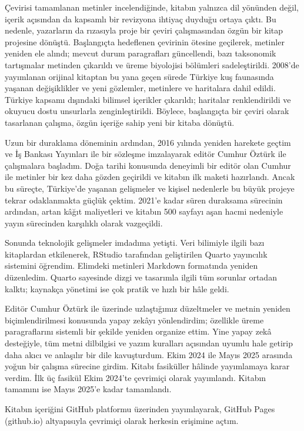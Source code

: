 \documentclass[
  10.5pt,
  a4paper,
  DIV=11,
  numbers=noendperiod,
  twocolumn]{scrreprt}
\begin{document}
Çevirisi tamamlanan metinler incelendiğinde, kitabın yalnızca dil
yönünden değil, içerik açısından da kapsamlı bir revizyona ihtiyaç
duyduğu ortaya çıktı. Bu nedenle, yazarların da rızasıyla proje bir
çeviri çalışmasından özgün bir kitap projesine dönüştü. Başlangıçta
hedeflenen çevirinin ötesine geçilerek, metinler yeniden ele alındı;
mevcut durum paragrafları güncellendi, bazı taksonomik tartışmalar
metinden çıkarıldı ve üreme biyolojisi bölümleri sadeleştirildi. 2008'de
yayımlanan orijinal kitaptan bu yana geçen sürede Türkiye kuş faunasında
yaşanan değişiklikler ve yeni gözlemler, metinlere ve haritalara dahil
edildi. Türkiye kapsamı dışındaki bilimsel içerikler çıkarıldı;
haritalar renklendirildi ve okuyucu dostu unsurlarla zenginleştirildi.
Böylece, başlangıçta bir çeviri olarak tasarlanan çalışma, özgün içeriğe
sahip yeni bir kitaba dönüştü.

Uzun bir duraklama döneminin ardından, 2016 yılında yeniden harekete
geçtim ve İş Bankası Yayınları ile bir sözleşme imzalayarak editör
Cumhur Öztürk ile çalışmalara başladım. Doğa tarihi konusunda deneyimli
bir editör olan Cumhur ile metinler bir kez daha gözden geçirildi ve
kitabın ilk maketi hazırlandı. Ancak bu süreçte, Türkiye'de yaşanan
gelişmeler ve kişisel nedenlerle bu büyük projeye tekrar odaklanmakta
güçlük çektim. 2021'e kadar süren duraksama sürecinin ardından, artan
kâğıt maliyetleri ve kitabın 500 sayfayı aşan hacmi nedeniyle yayın
sürecinden karşılıklı olarak vazgeçildi.

Sonunda teknolojik gelişmeler imdadıma yetişti. Veri bilimiyle ilgili
bazı kitaplardan etkilenerek, RStudio tarafından geliştirilen Quarto
yayıncılık sistemini öğrendim. Elimdeki metinleri Markdown formatında
yeniden düzenledim. Quarto sayesinde dizgi ve tasarımla ilgili tüm
sorunlar ortadan kalktı; kaynakça yönetimi ise çok pratik ve hızlı bir
hâle geldi.

Editör Cumhur Öztürk ile üzerinde uzlaştığımız düzeltmeler ve metnin
yeniden biçimlendirilmesi konusunda yapay zekâyı yönlendirdim; özellikle
üreme paragraflarını sistemli bir şekilde yeniden organize ettim. Yine
yapay zekâ desteğiyle, tüm metni dilbilgisi ve yazım kuralları açısından
uyumlu hale getirip daha akıcı ve anlaşılır bir dile kavuşturdum. Ekim
2024 ile Mayıs 2025 arasında yoğun bir çalışma sürecine girdim. Kitabı
fasiküller hâlinde yayımlamaya karar verdim. İlk üç fasikül Ekim 2024'te
çevrimiçi olarak yayımlandı. Kitabın tamamını ise Mayıs 2025'e kadar
tamamlandı.

Kitabın içeriğini GitHub platformu üzerinden yayımlayarak, GitHub Pages
(github.io) altyapısıyla çevrimiçi olarak herkesin erişimine açtım.
\end{document}
